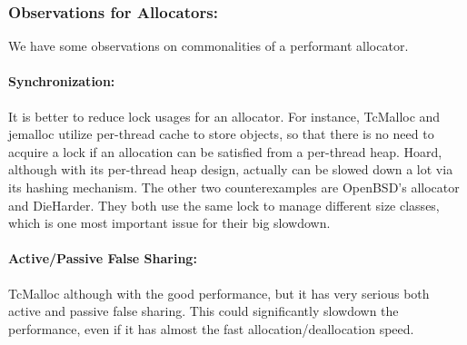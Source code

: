 \begin{comment}
\renewcommand{\arraystretch}{1.5}
\begin{table}[!ht]
  \centering
   \caption{Important   Metrics\label{tab:metrics}}
  
    \begin{tabular}{l|l|l|l}
    \hline
\multirow{5}{*} {Performance} & \multirow{3}{*}{Allocation Runtime} & New Allocation  (Small) & 80\\ \cline{3-4}
& & Reallocation  (Small) & 1000 \\ \cline{3-4}
& &  Large Allocation & 1000 \\ \cline{2-4}
& \multirow{2}{*}{Deallocation Runtime} & Small  &  \\ \cline{3-4}
& & Large & 100 \\ \cline{1-4}
    
    \end{tabular}
\end{table}
	
\end{comment}

\subsubsection{Observations for Allocators:} 

We have some observations on commonalities of a performant allocator. 

\paragraph{Synchronization:} It is better to reduce lock usages for an allocator. For instance, TcMalloc and jemalloc utilize per-thread cache to store objects, so that there is no need to acquire a lock if an allocation can be satisfied from a per-thread heap. Hoard, although with its per-thread heap design, actually can be slowed down a lot via its hashing mechanism. The other two counterexamples are OpenBSD's allocator and DieHarder. They both use the same lock to manage different size classes, which is one most important issue for their big slowdown. 

\paragraph{Active/Passive False Sharing:} TcMalloc although with the good performance, but it has very serious both active and passive false sharing. This could significantly slowdown the performance, even if it has almost the fast allocation/deallocation speed.  

